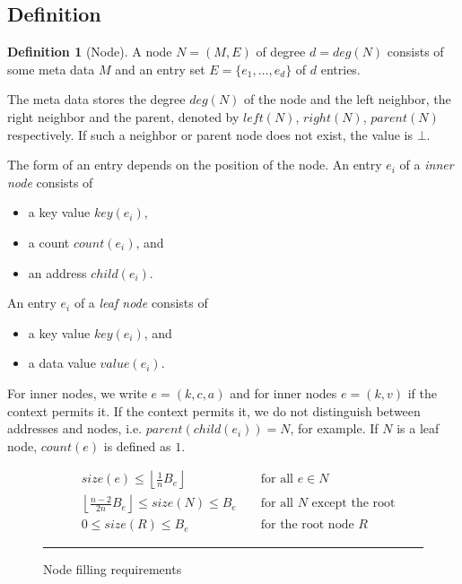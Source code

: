 \documentclass[a4paper, 8pt, twoclumn]{scrartcl}
\theoremstyle{plain}
\theoremstyle{definition}
\newtheorem{defi}[thm]{Definition}
\theoremstyle{remark}
\newcommand{\Beff}{B_e}
\newcommand{\Lfloor}{\left\lfloor}
\newcommand{\Rfloor}{\right\rfloor}
\begin{document}
\begin{multicols}{2}


\section{Definition} %

\begin{defi}[Node]
A node \mbox{$N = (M, E)$} of degree \mbox{$d = deg(N)$} consists of some
meta data $M$ and an entry set \mbox{$E = \{ e_1, \ldots, e_d \}$} of
$d$ entries.

The meta data stores the degree $deg(N)$ of the node and the left neighbor,
the right neighbor and the parent, denoted by $left(N)$, $right(N)$, $parent(N)$
respectively. If such a neighbor or parent node does not exist, the
value is $\bot$.

The form of an entry depends on the position of the node.
An entry $e_i$ of a {\em inner node} consists of
\begin{itemize}
\item a key value $key(e_i)$,
\item a count $count(e_i)$, and
\item an address $child(e_i)$.
\end{itemize}
An entry $e_i$ of a {\em leaf node} consists of
\begin{itemize}
\item a key value $key(e_i)$, and
\item a data value $value(e_i)$.
\end{itemize}
For inner nodes, we write \mbox{$e = (k, c, a)$} and for inner nodes 
\mbox{$e = (k, v)$}
if the context permits it.
If the context permits it, we do not distinguish between addresses and nodes,
i.e. \mbox{$parent(child(e_i)) = N$}, for example.
If $N$ is a leaf node, $count(e)$ is defined as $1$.
\end{defi}


\begin{figure*}[tb]
\newdimen \shortlinewidth {}\linewidth
\centering
\begin{minipage}{\shortlinewidth}
\begin{align}
& size(e) \leq \Lfloor \tfrac{1}{n} \Beff \Rfloor
	&& \text{ for all } e \in N \label{maxsize}\\
& \Lfloor \tfrac{n-2}{2n} \Beff \Rfloor \leq size(N) \leq \Beff
	&& \text{ for all } N \text{ except the root} \label{minsize}\\
& 0 \leq size(R) \leq \Beff
	&& \text{ for the root node } R \label{rootminsize}
\end{align}
\caption{Node filling requirements}
\hspace{2cm}
\hrule
\end{minipage}
\label{fill}
\end{figure*}


\end{multicols}
\end{document}
